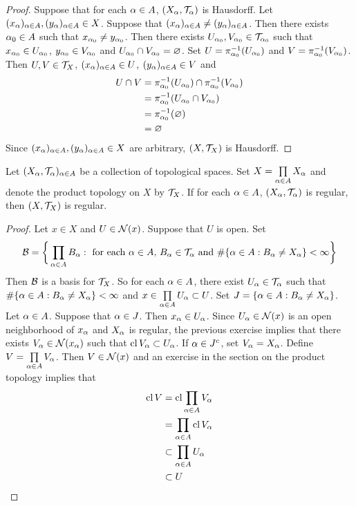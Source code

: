 \documentclass{book}
\begin{document}
	\begin{proof}
		Suppose that for each $\alpha \in A$, $(X_{\alpha}, \mathcal{T}_{\alpha})$ is Hausdorff. Let $(x_{\alpha})_{\alpha \in A}, (y_{\alpha})_{\alpha \in A} \in X$. Suppose that $(x_{\alpha})_{\alpha \in A} \neq (y_{\alpha})_{\alpha \in A}$. Then there exists $\alpha_0 \in A$ such that $x_{\alpha_0} \neq y_{\alpha_0}$. Then there exists $U_{\alpha_0}, V_{\alpha_0} \in \mathcal{T}_{\alpha_0}$ such that $x_{\alpha_0} \in U_{\alpha_0}$, $y_{\alpha_0} \in V_{\alpha_0}$ and $U_{\alpha_0} \cap V_{\alpha_0} = \varnothing$. Set $U = \pi_{\alpha_0}^{-1}(U_{\alpha_0})$ and $V = \pi_{\alpha_0}^{-1}(V_{\alpha_0})$. Then $U, V \in \mathcal{T}_X$, $(x_{\alpha})_{\alpha \in A} \in U$, $(y_{\alpha})_{\alpha \in A} \in V$ and 
		\begin{align*}
			U \cap V
			& = \pi_{\alpha_0}^{-1}(U_{\alpha_0}) \cap \pi_{\alpha_0}^{-1}(V_{\alpha_0}) \\
			& = \pi_{\alpha_0}^{-1}(U_{\alpha_0} \cap V_{\alpha_0}) \\
			& = \pi_{\alpha_0}^{-1}(\varnothing) \\
			& = \varnothing
		\end{align*}
		Since $(x_{\alpha})_{\alpha \in A}, (y_{\alpha})_{\alpha \in A} \in X$ are arbitrary, $(X, \mathcal{T}_X)$ is Hausdorff.
	\end{proof}
	
	\begin{ex}
		Let $(X_{\alpha}, \mathcal{T}_{\alpha})_{\alpha \in A}$ be a collection of topological spaces. Set $X = \prod\limits_{\alpha \in A} X_{\alpha}$ and denote the product topology on $X$ by $\mathcal{T}_X$. If for each $\alpha \in A$, $(X_{\alpha}, \mathcal{T}_{\alpha})$ is regular, then $(X, \mathcal{T}_X)$ is regular. 
	\end{ex}

	\begin{proof}
		Let $x \in X$ and $U \in \mathcal{N}(x)$. Suppose that $U$ is open. Set 
		$$\mathcal{B} = \bigg \{\prod_{\alpha \in A}B_{\alpha}: \text{ for each $\alpha \in A$,  $B_{\alpha} \in \mathcal{T}_{\alpha}$ and $\# \{\alpha \in A: B_{\alpha} \neq X_{\alpha}\} < \infty$} \bigg\}$$
		Then $\mathcal{B}$ is a basis for $\mathcal{T}_{X}$. So for each $\alpha \in A$, there exist $U_{\alpha} \in \mathcal{T}_{\alpha}$ such that $\# \{\alpha \in A: B_{\alpha} \neq X_{\alpha}\} < \infty$ and $x \in \prod\limits_{\alpha \in A} U_{\alpha} \subset U$. Set $J = \{\alpha \in A: B_{\alpha} \neq X_{\alpha}\}$. Let $\alpha \in A$. Suppose that $\alpha \in J$. Then $x_{\alpha} \in U_{\alpha}$. Since $U_{\alpha} \in \mathcal{N}(x)$ is an open neighborhood of $x_{\alpha}$ and $X_{\alpha}$ is regular, the previous exercise implies that there exists $V_{\alpha} \in \mathcal{N}(x_{\alpha})$ such that $\operatorname{cl} V_{\alpha} \subset U_{\alpha}$. If $\alpha \in J^c$, set $V_{\alpha} = X_{\alpha}$. Define $V = \prod\limits_{\alpha \in A} V_{\alpha}$. Then $V \in \mathcal{N}(x)$ and an exercise in the section on the product topology implies that 
		\begin{align*}
			\operatorname{cl} V
			& = \operatorname{cl} \prod_{\alpha \in A} V_{\alpha} \\
			& = \prod_{\alpha \in A} \operatorname{cl} V_{\alpha} \\
			& \subset \prod_{\alpha \in A} U_{\alpha} \\
			& \subset U
		\end{align*} 
	\end{proof}
	
\end{document}
